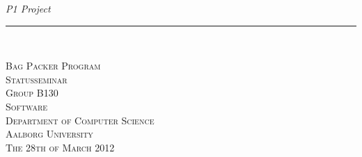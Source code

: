 \thispagestyle{empty}
\begin{flushright}
\vspace{3cm}

\phantom{hul}

\phantom{hul}

\phantom{hul}

\textsl{P1 Project} \\ \vspace{1cm}

\rule{13cm}{3mm} \\ \vspace{1.5cm}
\vspace{1cm}


\vspace{2cm} 
\textsc{\Large Bag Packer Program \\
Statusseminar\\
Group B130\\
Software\\
Department of Computer Science\\
Aalborg University\\
The 28th of March 2012\\
}
\end{flushright}
